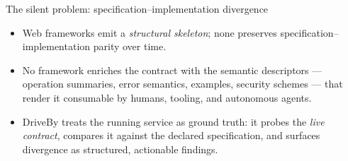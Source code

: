 \documentclass[11pt,aspectratio=169]{beamer}
\begin{document}
\begin{frame}{The silent problem: specification--implementation divergence}
\begin{center}
\end{center}

\vspace{-0.4em}
\scriptsize
\begin{itemize}\setlength\itemsep{0.15em}
\item Web frameworks emit a \emph{structural skeleton}; \alert{none preserves
  specification--implementation parity over time}.
\item No framework \alert{enriches the contract} with the semantic descriptors
  --- operation summaries, error semantics, examples, security schemes ---
  that render it consumable by humans, tooling, and autonomous agents.
\item DriveBy treats the running service as ground truth: it probes the
  \emph{live contract}, compares it against the declared specification,
  and surfaces divergence as structured, actionable findings.
\end{itemize}

\end{frame}
\end{document}

